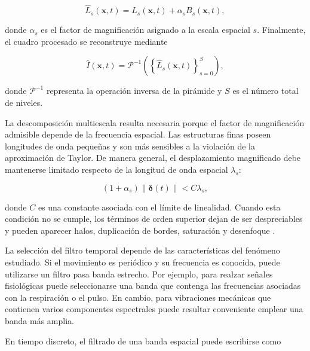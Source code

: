 \begin{equation}
    \widehat{L}_s(\mathbf{x},t)
    =
    L_s(\mathbf{x},t)
    +
    \alpha_s B_s(\mathbf{x},t),
    \label{eq:banda_euleriana_amplificada}
\end{equation}

donde $\alpha_s$ es el factor de magnificación asignado a la escala espacial $s$. Finalmente, el cuadro procesado se reconstruye mediante

\begin{equation}
    \widehat{I}(\mathbf{x},t)
    =
    \mathcal{P}^{-1}
    \left(
        \left\{
            \widehat{L}_s(\mathbf{x},t)
        \right\}_{s=0}^{S}
    \right),
    \label{eq:reconstruccion_euleriana}
\end{equation}

donde $\mathcal{P}^{-1}$ representa la operación inversa de la pirámide y $S$ es el número total de niveles.

La descomposición multiescala resulta necesaria porque el factor de magnificación admisible depende de la frecuencia espacial. Las estructuras finas poseen longitudes de onda pequeñas y son más sensibles a la violación de la aproximación de Taylor. De manera general, el desplazamiento magnificado debe mantenerse limitado respecto de la longitud de onda espacial $\lambda_s$:

\begin{equation}
    (1+\alpha_s)
    \left\|
        \boldsymbol{\delta}(t)
    \right\|
    <
    C\lambda_s,
    \label{eq:limite_linealidad_euleriana}
\end{equation}

donde $C$ es una constante asociada con el límite de linealidad. Cuando esta condición no se cumple, los términos de orden superior dejan de ser despreciables y pueden aparecer halos, duplicación de bordes, saturación y desenfoque \cite{wu2012eulerian}.

La selección del filtro temporal depende de las características del fenómeno estudiado. Si el movimiento es periódico y su frecuencia es conocida, puede utilizarse un filtro pasa banda estrecho. Por ejemplo, para realzar señales fisiológicas puede seleccionarse una banda que contenga las frecuencias asociadas con la respiración o el pulso. En cambio, para vibraciones mecánicas que contienen varios componentes espectrales puede resultar conveniente emplear una banda más amplia.

En tiempo discreto, el filtrado de una banda espacial puede escribirse como

